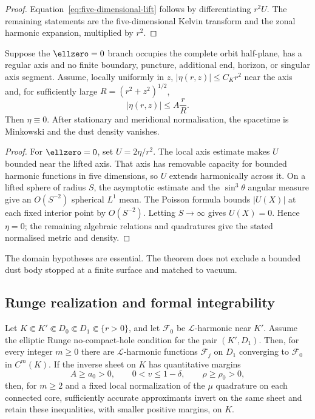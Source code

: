 \begin{proof}
Equation~\eqref{eq:five-dimensional-lift} follows by differentiating
$r^2U$. The remaining statements are the five-dimensional Kelvin transform
and the zonal harmonic expansion, multiplied by $r^2$.
\end{proof}

\begin{theorem}[Global regular-axis rigidity for $\ellzero=0$]
\label{thm:ellzero-liouville}
Suppose the $\ellzero=0$ branch occupies the complete orbit half-plane, has
a regular axis and no finite boundary, puncture, additional end, horizon,
or singular axis segment. Assume, locally uniformly in $z$,
$|\eta(r,z)|\leqslant C_Kr^2$ near the axis and, for sufficiently large
$R=(r^2+z^2)^{1/2}$,
$$
|\eta(r,z)|\leqslant A\frac rR.
$$
Then $\eta\equiv0$. After stationary and meridional normalisation, the
spacetime is Minkowski and the dust density vanishes.
\end{theorem}

\begin{proof}
For $\ellzero=0$, set $U=2\eta/r^2$. The local axis estimate makes $U$
bounded near the lifted axis. That axis has removable capacity for bounded
harmonic functions in five dimensions, so $U$ extends harmonically across
it. On a lifted sphere of radius $S$, the asymptotic estimate and the
$\sin^3\theta$ angular measure give an $O(S^{-2})$ spherical $L^1$ mean.
The Poisson formula bounds $|U(X)|$ at each fixed interior point by
$O(S^{-2})$. Letting $S\to\infty$ gives $U(X)=0$. Hence $\eta=0$; the
remaining algebraic relations and quadratures give the stated normalised
metric and density.
\end{proof}

The domain hypotheses are essential. The theorem does not exclude a bounded
dust body stopped at a finite surface and matched to vacuum.

\subsection{Runge realization and formal integrability}

\begin{theorem}
\label{thm:runge-realization}
Let $K\Subset K'\Subset D_0\Subset D_1\Subset\{r>0\}$, and let
$\mathcal F_0$ be $\mathcal L$-harmonic near $K'$. Assume the elliptic
Runge no-compact-hole condition for the pair $(K',D_1)$. Then, for every
integer $m\geqslant0$ there are
$\mathcal L$-harmonic functions $\mathcal F_j$ on $D_1$ converging to
$\mathcal F_0$ in $C^m(K)$. If the inverse sheet on $K$ has quantitative
margins
$$
A\geqslant a_0>0,\qquad 0<v\leqslant1-\delta,
\qquad \rho\geqslant\rho_0>0,
$$
then, for $m\geqslant2$ and a fixed local normalization of the $\mu$
quadrature on each connected core, sufficiently accurate approximants
invert on the same sheet and retain these inequalities, with smaller
positive margins, on $K$.
\end{theorem}

